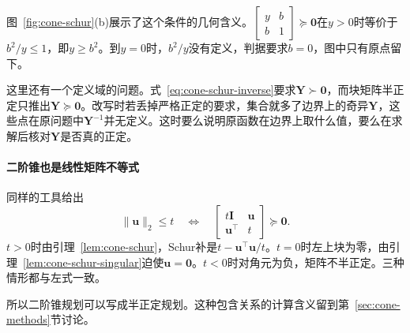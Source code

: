 图~\ref{fig:cone-schur}(b)展示了这个条件的几何含义。$\begin{bmatrix}y&b\\b&1\end{bmatrix}\succeq\bm{0}$在$y>0$时等价于$b^2/y\leq1$，即$y\geq b^2$。到$y=0$时，$b^2/y$没有定义，判据要求$b=0$，图中只有原点留下。

这里还有一个定义域的问题。式~\eqref{eq:cone-schur-inverse}要求$\bm{Y}\succ\bm{0}$，而块矩阵半正定只推出$\bm{Y}\succeq\bm{0}$。改写时若丢掉严格正定的要求，集合就多了边界上的奇异$\bm{Y}$，这些点在原问题中$\bm{Y}^{-1}$并无定义。这时要么说明原函数在边界上取什么值，要么在求解后核对$\bm{Y}$是否真的正定。

\paragraph{二阶锥也是线性矩阵不等式}
同样的工具给出
\begin{equation}
 \lVert\bm{u}\rVert_2\leq t\quad\Longleftrightarrow\quad\begin{bmatrix}t\bm{I}&\bm{u}\\\bm{u}^\top&t\end{bmatrix}\succeq\bm{0}.
 \label{eq:cone-soc-as-lmi}
\end{equation}
$t>0$时由引理~\ref{lem:cone-schur}，Schur补是$t-\bm{u}^\top\bm{u}/t$。$t=0$时左上块为零，由引理~\ref{lem:cone-schur-singular}迫使$\bm{u}=\bm{0}$。$t<0$时对角元为负，矩阵不半正定。三种情形都与左式一致。

所以二阶锥规划可以写成半正定规划。这种包含关系的计算含义留到第~\ref{sec:cone-methods}节讨论。
